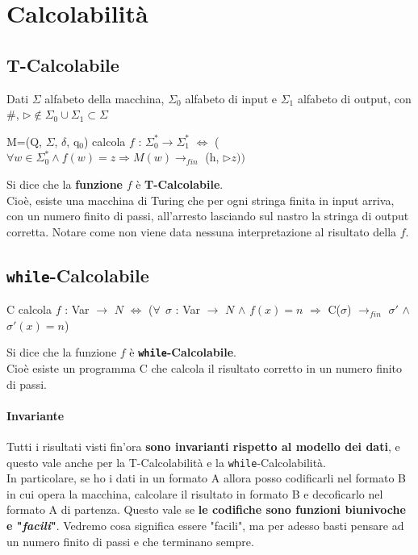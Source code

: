 \documentclass[10pt]{book}
\begin{document}
\section{Calcolabilità}
\subsection{T-Calcolabile}
Dati $\Sigma$ alfabeto della macchina, $\Sigma_0$ alfabeto di input e $\Sigma_1$ alfabeto di output, con \#, $\triangleright \not\in \Sigma_0 \cup \Sigma_1 \subset \Sigma$
\begin{center}
M=(Q, $\Sigma$, $\delta$, q$_0$) calcola $f$ : $\Sigma_0^* \longrightarrow \Sigma_1^*$ $\Leftrightarrow$ ($\forall w \in \Sigma_0^* \wedge f(w) = z \Rightarrow M(w) \rightarrow_{fin}$ (h, $\triangleright z))$
\end{center}
Si dice che la \textbf{funzione} $f$ è \textbf{T-Calcolabile}.\\
Cioè, esiste una macchina di Turing che per ogni stringa finita in input arriva, con un numero finito di passi, all'arresto lasciando sul nastro la stringa di output corretta. Notare come non viene data nessuna interpretazione al risultato della $f$.
\subsection{\texttt{while}-Calcolabile}
\begin{center}
C calcola $f$ : Var $\rightarrow$ $N$ $\Leftrightarrow$ ($\forall\:\: \sigma$ : Var $\rightarrow$ $N$ $\wedge$ $f(x) = n$ $\Rightarrow$ C($\sigma$) $\rightarrow_{fin}$ $\sigma'$ $\wedge$ $\sigma'(x) = n$)
\end{center}
Si dice che la funzione $f$ è \textbf{\texttt{while}-Calcolabile}.\\
Cioè esiste un programma C che calcola il risultato corretto in un numero finito di passi.
\paragraph{Invariante} Tutti i risultati visti fin'ora \textbf{sono invarianti rispetto al modello dei dati}, e questo vale anche per la T-Calcolabilità e la \texttt{while}-Calcolabilità.\\
In particolare, se ho i dati in un formato A allora posso codificarli nel formato B in cui opera la macchina, calcolare il risultato in formato B e decoficarlo nel formato A di partenza. Questo vale se \textbf{le codifiche sono funzioni biunivoche e "\textit{facili}"}. Vedremo cosa significa essere "facili", ma per adesso basti pensare ad un numero finito di passi e che terminano sempre.
\end{document}
